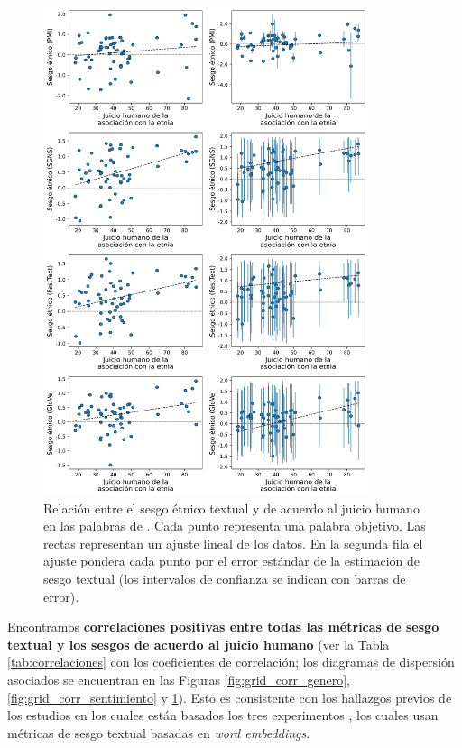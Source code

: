 \begin{figure}[H]
    \centering
    \includegraphics[width=0.85\textwidth]{img/grid_mturk-race.png}
    \caption[Relación entre el sesgo étnico textual y de acuerdo al juicio humano en las palabras de \citet{kozlowski2019geometry}]{
        Relación entre el sesgo étnico textual y de acuerdo al juicio humano en las palabras de \citet{kozlowski2019geometry}. Cada punto representa una palabra objetivo. Las rectas representan un ajuste lineal de los datos. En la segunda fila el ajuste pondera cada punto por el error estándar de la estimación de sesgo textual (los intervalos de confianza se indican con barras de error).
    }
    \label{fig:grid_corr_etnico}
\end{figure}


Encontramos \textbf{correlaciones positivas entre todas las métricas de sesgo textual y los sesgos de acuerdo al juicio humano} (ver la Tabla \ref{tab:correlaciones} con los coeficientes de correlación; los diagramas de dispersión asociados se encuentran en las Figuras \ref{fig:grid_corr_genero}, \ref{fig:grid_corr_sentimiento} y \ref{fig:grid_corr_etnico}). Esto es consistente con los hallazgos previos de los estudios en los cuales están basados los tres experimentos \citep{lewis2020gender,kozlowski2019geometry,toney2021valnorm}, los cuales usan métricas de sesgo textual basadas en \emph{word embeddings}.

